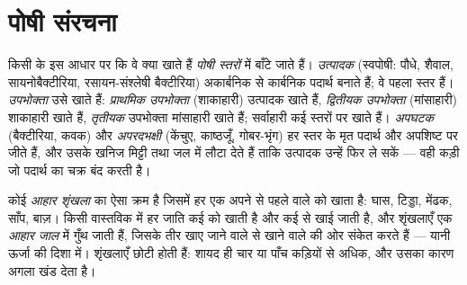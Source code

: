 \section{पोषी संरचना}

\begin{definition}\label{def:b1:ecosystem-organization:trophic}
किसी  के  इस आधार पर कि वे क्या खाते हैं \emph{पोषी स्तरों}
में बाँटे जाते हैं। \emph{उत्पादक} (स्वपोषी: पौधे, शैवाल,
सायनोबैक्टीरिया, रसायन-संश्लेषी बैक्टीरिया) अकार्बनिक से कार्बनिक पदार्थ
बनाते हैं; वे पहला स्तर हैं। \emph{उपभोक्ता} उसे खाते हैं:
\emph{प्राथमिक उपभोक्ता} (शाकाहारी) उत्पादक खाते हैं, \emph{द्वितीयक
उपभोक्ता} (मांसाहारी) शाकाहारी खाते हैं, \emph{तृतीयक} उपभोक्ता
मांसाहारी खाते हैं; सर्वाहारी कई स्तरों पर खाते हैं। \emph{अपघटक}
(बैक्टीरिया, कवक) और \emph{अपरदभक्षी} (केंचुए, काष्ठजूँ, गोबर-भृंग) हर
स्तर के मृत पदार्थ और अपशिष्ट पर जीते हैं, और उसके खनिज मिट्टी तथा जल
में लौटा देते हैं ताकि उत्पादक उन्हें फिर ले सकें --- वही कड़ी जो
पदार्थ का चक्र बंद करती है।
\end{definition}

\begin{definition}[आहार शृंखला, आहार जाल]\label{def:b1:ecosystem-organization:foodweb}
कोई \emph{आहार शृंखला}  का ऐसा क्रम है जिसमें हर एक अपने से पहले
वाले को खाता है: घास, टिड्डा, मेंढक, साँप, बाज़। किसी वास्तविक  में
हर जाति कई को खाती है और कई से खाई जाती है, और शृंखलाएँ एक \emph{आहार
जाल} में गुँथ जाती हैं, जिसके तीर खाए जाने वाले से खाने वाले की ओर संकेत
करते हैं --- यानी ऊर्जा की दिशा में। शृंखलाएँ छोटी होती हैं: शायद ही चार
या पाँच कड़ियों से अधिक, और उसका कारण अगला खंड देता है।
\end{definition}

